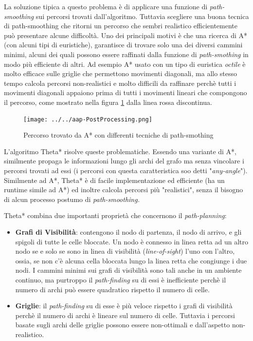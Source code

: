 \documentclass[11pt]{book}
\begin{document}
\par{
La soluzione tipica a questo problema \`e di applicare una funzione di \emph{path-smoothing} sui percorsi trovati dall'algoritmo. Tuttavia scegliere una buona tecnica di path-smoothing che ritorni un percorso che sembri realistico efficientemente pu\`o presentare alcune difficolt\`a. Uno dei principali motivi \`e che una ricerca di A* (con alcuni tipi di euristiche), garantisce di trovare solo una dei diversi cammini minimi, alcuni dei quali possono essere raffinati dalla funzione di \emph{path-smothing} in modo pi\`u efficiente di altri. Ad esempio A* usato con un tipo di euristica \emph{octile} \`e molto efficace sulle griglie che permettono movimenti diagonali, ma allo stesso tempo calcola percorsi non-realistici e molto difficili da raffinare perch\`e tutti i movimenti diagonali appaiono prima di tutti i movimenti lineari che compongono il percorso, come mostrato nella figura \ref{img7} dalla linea rossa discontinua.
\begin{figure}[htp]
\centering
\texttt{[image: ../../aap-PostProcessing.png]}
\caption{Percorso trovato da A* con differenti tecniche di path-smothing}
\label{img7}
\end{figure}
}


\par{
L'algoritmo Theta* risolve queste problematiche. Essendo una variante di A*, similmente propaga le informazioni lungo gli archi del grafo ma senza vincolare i percorsi trovati ad essi (i percorsi con questa caratteristica soo detti "\emph{any-angle}"). 
Similmente ad A*, Theta* \`e di facile implementazione ed efficiente (ha un runtime simile ad A*) ed inoltre calcola percorsi pi\`u "realistici", senza il bisogno di alcun processo postumo di \emph{path-smoothing.} 
}
\par{
Theta* combina due importanti propriet\`a che concernono il \emph{path-planning}: 


\begin{itemize}
\item \textbf{Grafi di Visibilit\`a}: contengono il nodo di partenza, il nodo di arrivo, e gli spigoli di tutte le celle bloccate. Un nodo \`e connesso in linea retta ad un altro nodo se e solo se sono in linea di visibilit\`a (\emph{line-of-sight}) l'uno con l'altro, ossia, se non c'\`e alcuna cella bloccata lungo la linea retta che congiunge i due nodi. I cammini minimi sui grafi di visibilit\`a sono tali anche in un ambiente continuo, ma purtroppo il \emph{path-finding} su di essi \`e inefficiente perch\`e il numero di archi pu\`o essere quadratico rispetto il numero di celle.
\item \textbf{Griglie}: il \emph{path-finding} su di esse \`e pi\`u veloce rispetto i grafi di visibilit\`a perch\`e il numero di archi \`e lineare sul numero di celle. Tuttavia i percorsi basate sugli archi delle griglie possono essere non-ottimali e dall'aspetto non-realistico.
\end{itemize}}
\end{document}
